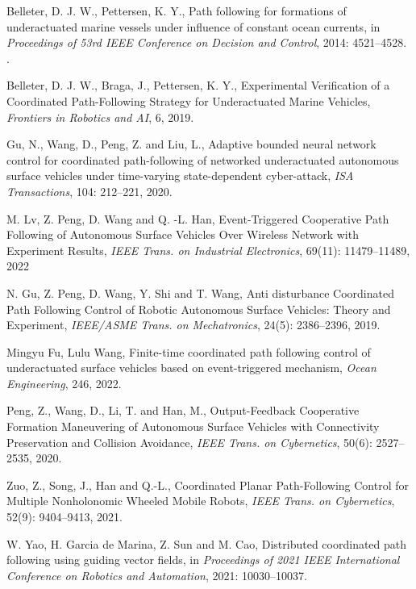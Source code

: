 \documentclass[a4paper,fleqn]{cas-dc}
\begin{document}
\begin{thebibliography}{0}
	
	 Belleter, D. J. W., Pettersen, K. Y., Path following for formations of underactuated marine vessels under influence of constant ocean currents, in \emph{Proceedings of 53rd IEEE Conference on Decision and Control}, 2014: 4521--4528. .
	
	 Belleter, D. J. W., Braga, J., Pettersen, K. Y., Experimental Verification of a Coordinated Path-Following Strategy for Underactuated Marine Vehicles, \emph{Frontiers in Robotics and AI}, 6, 2019.
	
	 Gu, N., Wang, D., Peng, Z. and Liu, L., Adaptive bounded neural network control for coordinated path-following of networked underactuated autonomous surface vehicles under time-varying state-dependent cyber-attack, \emph{ISA Transactions}, 104: 212--221, 2020.
	
	 M. Lv, Z. Peng, D. Wang and Q. -L. Han, Event-Triggered Cooperative Path Following of Autonomous Surface Vehicles Over Wireless Network with Experiment Results, \emph{IEEE Trans. on Industrial Electronics}, 69(11): 11479--11489, 2022
	
	 N. Gu, Z. Peng, D. Wang, Y. Shi and T. Wang, Anti disturbance Coordinated Path Following Control of Robotic Autonomous Surface Vehicles: Theory and Experiment, \emph{IEEE/ASME Trans. on Mechatronics}, 24(5): 2386--2396, 2019.
	
	 Mingyu Fu, Lulu Wang, Finite-time coordinated path following control of underactuated surface vehicles based on event-triggered mechanism, \emph{Ocean Engineering}, 246, 2022.
	
	 Peng, Z., Wang, D., Li, T. and Han, M., Output-Feedback Cooperative Formation Maneuvering of Autonomous Surface Vehicles with Connectivity Preservation and Collision Avoidance, \emph{IEEE Trans. on Cybernetics}, 50(6): 2527--2535, 2020.
	
	 Zuo, Z., Song, J., Han and Q.-L., Coordinated Planar Path-Following Control for Multiple Nonholonomic Wheeled Mobile Robots, \emph{IEEE Trans. on Cybernetics}, 52(9): 9404--9413, 2021.
	
	 W. Yao, H. Garcia de Marina, Z. Sun and M. Cao, Distributed coordinated path following using guiding vector fields, in \emph{Proceedings of 2021 IEEE International Conference on Robotics and Automation}, 2021: 10030--10037.
	

\end{thebibliography}
\end{document}

